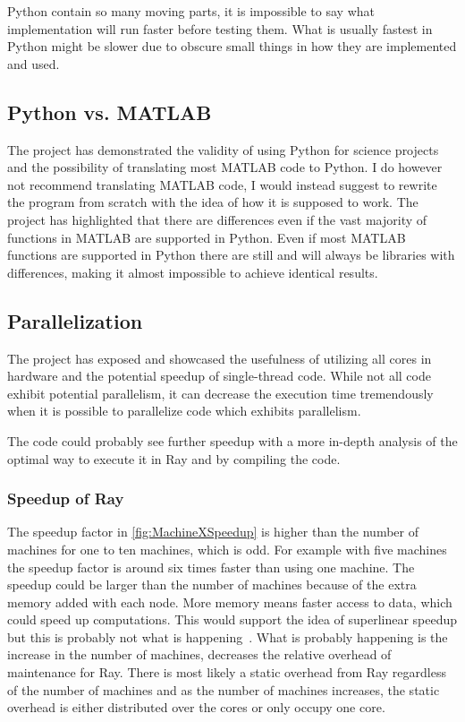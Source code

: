 \documentclass[12pt, a4paper]{article}
\begin{document}
Python contain so many moving parts, it is impossible to say what implementation will run faster before testing them.
What is usually fastest in Python might be slower due to obscure small things in how they are implemented and used.

\subsection{Python vs. MATLAB}

The project has demonstrated the validity of using Python for science projects and the possibility of translating most MATLAB code to Python.
I do however not recommend translating MATLAB code, I would instead suggest to rewrite the program from scratch with the idea of how it is supposed to work.
The project has highlighted that there are differences even if the vast majority of functions in MATLAB are supported in Python.
Even if most MATLAB functions are supported in Python there are still and will always be libraries with differences, making it almost impossible to achieve identical results.

\subsection{Parallelization}

The project has exposed and showcased the usefulness of utilizing all cores in hardware and the potential speedup of single-thread code.
While not all code exhibit potential parallelism, it can decrease the execution time tremendously when it is possible to parallelize code which exhibits parallelism.

The code could probably see further speedup with a more in-depth analysis of the optimal way to execute it in Ray and by compiling the code.

\subsubsection{Speedup of Ray}\label{RaySpeedup}

The speedup factor in \cref{fig:MachineXSpeedup} is higher than the number of machines for one to ten machines, which is odd.
For example with five machines the speedup factor is around six times faster than using one machine.
The speedup could be larger than the number of machines because of the extra memory added with each node.
More memory means faster access to data, which could speed up computations.
This would support the idea of superlinear speedup but this is probably not what is happening~\cite{superlinearSPEED}.
What is probably happening is the increase in the number of machines, decreases the relative overhead of maintenance for Ray.
There is most likely a static overhead from Ray regardless of the number of machines and as the number of machines increases, the static overhead is either distributed over the cores or only occupy one core.
\end{document}
